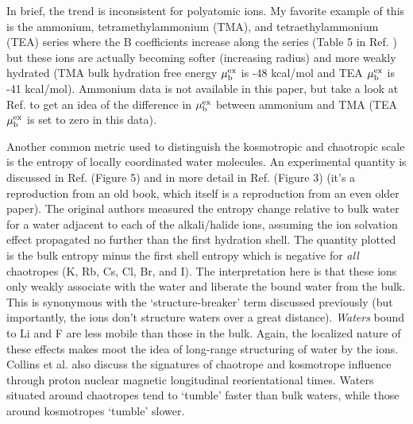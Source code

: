 \begin{intro}
    In brief, the trend is inconsistent for polyatomic ions. My favorite example of this is the ammonium, tetramethylammonium (TMA), and tetraethylammonium (TEA) series where
    the B coefficients increase along the series (Table 5 in Ref. \cite{jenkins1995viscosity}) but these ions are actually becoming softer (increasing radius) and more weakly 
    hydrated (TMA bulk hydration free energy $\mu^{\mathrm{ex}}_{\mathrm{b}}$ is -48 kcal/mol and TEA $\mu^{\mathrm{ex}}_{\mathrm{b}}$ is -41 kcal/mol)\cite{abraham1978}. Ammonium data is not available 
    in this paper, but take a look at Ref. \cite{marcus1985book} to get an idea of the difference in $\mu^{\mathrm{ex}}_{\mathrm{b}}$ between ammonium and TMA (TEA $\mu^{\mathrm{ex}}_{\mathrm{b}}$ is 
    set to zero in this data).
    
    Another common metric used to distinguish the kosmotropic and chaotropic scale is the entropy of locally coordinated water molecules. An experimental quantity is discussed
    in Ref. \cite{collins2007review} (Figure 5) and in more detail in Ref. \cite{collins1985hofmeister} (Figure 3) (it's a reproduction from an old book, which itself is a 
    reproduction from an even older paper). The original authors measured the entropy change relative to bulk water for a water adjacent to each of the alkali/halide ions, 
    assuming the ion solvation effect propagated no further than the first hydration shell. The quantity plotted is the bulk entropy minus the first shell entropy which 
    is negative for \emph{all} chaotropes (K\sur{+}, Rb\sur{+}, Cs\sur{+}, Cl\sur{-}, Br\sur{-}, and I\sur{-}). The interpretation here is that these ions only weakly 
    associate with the water and liberate the bound water from the bulk. This is synonymous with the `structure-breaker' term discussed previously (but importantly, the 
    ions don't structure waters over a great distance). \emph{Waters} bound to Li\sur{+} and F\sur{-} are less mobile than those in the bulk. Again, the localized nature of 
    these effects makes moot the idea of long-range structuring of water by the ions. Collins et al. also discuss the signatures of chaotrope and kosmotrope influence through
    proton nuclear magnetic longitudinal reorientational times\cite{collins1985hofmeister}. Waters situated around chaotropes tend to `tumble' faster than bulk waters, while those
    around kosmotropes `tumble' slower.
    

\end{intro}
